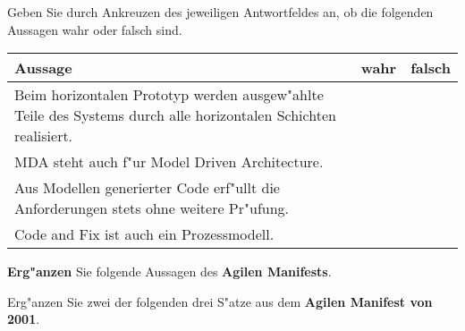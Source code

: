 \documentclass[12pt]{exam}
\begin{document}
\begin{questions}
\addpoints

\question[4] Geben Sie durch Ankreuzen des jeweiligen Antwortfeldes an, ob die folgenden Aussagen wahr oder falsch sind. \\
\addpoints
\begin{tabular}{| p{12cm} | c | c |} \hline
    \textbf{Aussage} & \textbf{wahr} & \textbf{falsch} \\ \hline
    Beim horizontalen Prototyp werden ausgew"ahlte Teile des Systems durch alle horizontalen Schichten realisiert. & & \\ \hline
    MDA steht auch f"ur Model Driven Architecture. & & \\ \hline
    Aus Modellen generierter Code erf"ullt die Anforderungen stets ohne weitere Pr"ufung. & & \\ \hline
    Code and Fix ist auch ein Prozessmodell. & & \\ \hline
\end{tabular}

\question[3] \textbf{Erg"anzen} Sie folgende Aussagen des \textbf{Agilen Manifests}.
\addpoints
{}

\question[2] Erg"anzen Sie zwei der folgenden drei S"atze aus dem \textbf{Agilen Manifest von 2001}.
\addpoints
{}
\end{questions}
\end{document}
